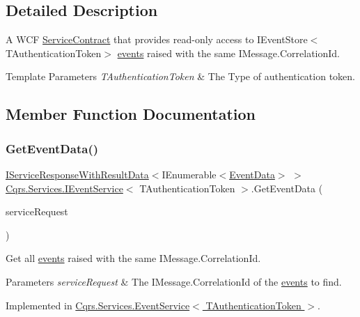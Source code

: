 \subsection{Detailed Description}
A W\+CF \hyperlink{}{Service\+Contract} that provides read-\/only access to I\+Event\+Store$<$\+T\+Authentication\+Token$>$ \hyperlink{}{events} raised with the same I\+Message.\+Correlation\+Id. 


\begin{DoxyTemplParams}{Template Parameters}
{\em T\+Authentication\+Token} & The Type of authentication token.\\
\hline
\end{DoxyTemplParams}


\subsection{Member Function Documentation}
\mbox{\label{interfaceCqrs_1_1Services_1_1IEventService_aa41b82bc398bfab0b2fd519d7f067946_aa41b82bc398bfab0b2fd519d7f067946}} 
\subsubsection{\texorpdfstring{Get\+Event\+Data()}{GetEventData()}}
{\footnotesize\ttfamily \hyperlink{interfaceCqrs_1_1Services_1_1IServiceResponseWithResultData}{I\+Service\+Response\+With\+Result\+Data}$<$I\+Enumerable$<$\hyperlink{classCqrs_1_1Events_1_1EventData}{Event\+Data}$>$ $>$ \hyperlink{interfaceCqrs_1_1Services_1_1IEventService}{Cqrs.\+Services.\+I\+Event\+Service}$<$ T\+Authentication\+Token $>$.Get\+Event\+Data (\begin{DoxyParamCaption}\item[{\hyperlink{interfaceCqrs_1_1Services_1_1IServiceRequestWithData}{I\+Service\+Request\+With\+Data}$<$ T\+Authentication\+Token, Guid $>$}]{service\+Request }\end{DoxyParamCaption})}



Get all \hyperlink{}{events} raised with the same I\+Message.\+Correlation\+Id. 


\begin{DoxyParams}{Parameters}
{\em service\+Request} & The I\+Message.\+Correlation\+Id of the \hyperlink{}{events} to find.\\
\hline
\end{DoxyParams}


Implemented in \hyperlink{classCqrs_1_1Services_1_1EventService_a9a68d774ac754e39be56d3e0449f14d7_a9a68d774ac754e39be56d3e0449f14d7}{Cqrs.\+Services.\+Event\+Service$<$ T\+Authentication\+Token $>$}.

